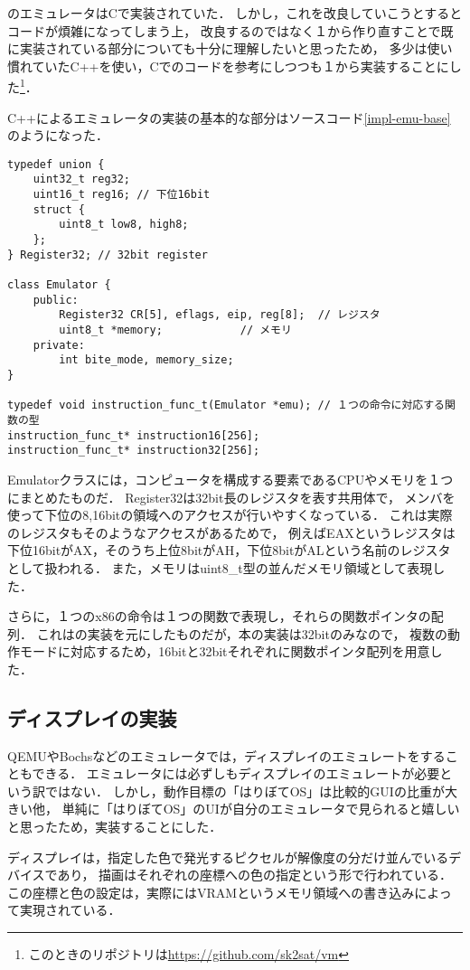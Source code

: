 \documentclass[10pt,a4j]{jsarticle}
\begin{document}
\cite{learn-x86-by-emu}のエミュレータはCで実装されていた．
しかし，これを改良していこうとするとコードが煩雑になってしまう上，
改良するのではなく１から作り直すことで既に実装されている部分についても十分に理解したいと思ったため，
多少は使い慣れていたC++を使い，Cでのコードを参考にしつつも１から実装することにした\footnote{このときのリポジトリは\url{https://github.com/sk2sat/vm}}．

C++によるエミュレータの実装の基本的な部分はソースコード\ref{impl-emu-base}のようになった．
\begin{lstlisting}[caption=エミュレータの基本的な実装,label=impl-emu-base]
typedef union {
	uint32_t reg32;
	uint16_t reg16; // 下位16bit
	struct {
		uint8_t low8, high8;
	};
} Register32; // 32bit register

class Emulator {
	public:
		Register32 CR[5], eflags, eip, reg[8];	// レジスタ
		uint8_t *memory;			// メモリ
	private:
		int bite_mode, memory_size;
}

typedef void instruction_func_t(Emulator *emu); // １つの命令に対応する関数の型
instruction_func_t* instruction16[256];
instruction_func_t* instruction32[256];
\end{lstlisting}
Emulatorクラスには，コンピュータを構成する要素であるCPUやメモリを１つにまとめたものだ．
Register32は32bit長のレジスタを表す共用体で，
メンバを使って下位の8,16bitの領域へのアクセスが行いやすくなっている．
これは実際のレジスタもそのようなアクセスがあるためで，
例えばEAXというレジスタは下位16bitがAX，そのうち上位8bitがAH，下位8bitがALという名前のレジスタとして扱われる．
また，メモリはuint8\_t型の並んだメモリ領域として表現した．

さらに，１つのx86の命令は１つの関数で表現し，それらの関数ポインタの配列．
これは\cite{learn-x86-by-emu}の実装を元にしたものだが，本の実装は32bitのみなので，
複数の動作モードに対応するため，16bitと32bitそれぞれに関数ポインタ配列を用意した．

\subsection{ディスプレイの実装}
QEMUやBochsなどのエミュレータでは，ディスプレイのエミュレートをすることもできる．
エミュレータには必ずしもディスプレイのエミュレートが必要という訳ではない．
しかし，動作目標の「はりぼてOS」は比較的GUIの比重が大きい他，
単純に「はりぼてOS」のUIが自分のエミュレータで見られると嬉しいと思ったため，実装することにした．

ディスプレイは，指定した色で発光するピクセルが解像度の分だけ並んでいるデバイスであり，
描画はそれぞれの座標への色の指定という形で行われている．
この座標と色の設定は，実際にはVRAMというメモリ領域への書き込みによって実現されている．
\end{document}
